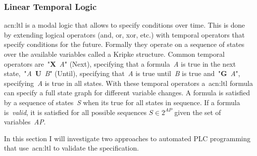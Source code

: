 \subsubsection{Linear Temporal Logic}
\label{sec:sub:ltl}

\acrfull{acn:ltl} is a modal logic that allows to specify conditions over time.
This is done by extending logical operators (and, or, xor, etc.) with temporal operators that specify conditions for the future.
Formally they operate on a sequence of states over the available variables called a Kripke structure.
Common temporal operators are~"\textbf{X}~\textit{A}" (Next), specifying that a formula~\textit{A} is true in the next state,~"\textit{A}~\textbf{U}~\textit{B}" (Until), specifying that~\textit{A} is true until~\textit{B} is true and~"\textbf{G}~\textit{A}", specifying~\textit{A} is true in all states.
With these temporal operators a~\acrfull{acn:ltl} formula can specify a full state graph for different variable changes.
A formula is satisfied by a sequence of states~\textit{S} when its true for all states in sequence.
If a formula is~\textit{valid}, it is satisfied for all possible sequences $ S\in 2^{AP} $ given the set of variables~\textit{AP}.

In this section I will investigate two approaches to automated PLC programming that use~\acrshort{acn:ltl} to validate the specification.

